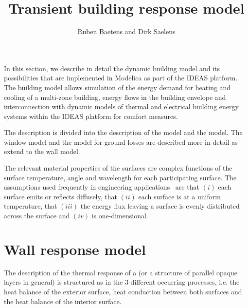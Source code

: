 
\title{Transient building response model}
\author{Ruben Baetens and Dirk Saelens}
\maketitle


\vspace{\baselineskip}

In this section, we describe in detail the dynamic building model and its possibilities that are implemented in Modelica as part of the IDEAS platform. The building model allows simulation of the energy demand for heating and cooling of a multi-zone building, energy flows in the building envelope and interconnection with dynamic models of thermal and electrical building energy systems within the IDEAS platform for comfort measures. 

The description is divided into the description of the  model and the  model. The window model and the model for ground losses are described more in detail as extend to the wall model.

The relevant material properties of the surfaces are complex functions of the surface temperature, angle and wavelength for each participating surface. The assumptions used frequently in engineering applications~\cite{Walton1983} are that $(i)$ each surface emits or reflects diffusely, that $(ii)$ each surface is at a uniform temperature, that $(iii)$ the energy flux leaving a surface is evenly distributed across the surface and $(iv)$ is one-dimensional.

\section{Wall response model}

The description of the thermal response of a  (or a structure of parallel opaque layers in general) is structured as in the 3 different occurring processes, i.e. the heat balance of the exterior surface, heat  conduction between both surfaces and the heat balance of the interior surface.

